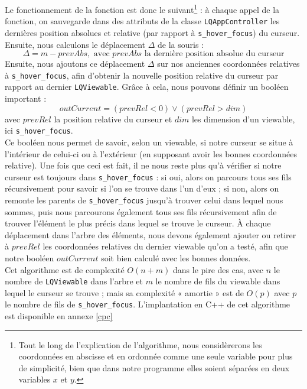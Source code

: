 \documentclass[twoside]{report}
\begin{document}
Le fonctionnement de la fonction est donc le suivant\footnote{Tout le long de l'explication de l'algorithme, nous considèrerons les coordonnées en abscisse et en ordonnée comme une seule variable pour plus de simplicité, bien que dans notre programme elles soient séparées en deux variables $x$ et $y$.} : à chaque appel de la fonction, on sauvegarde dans des attributs de la classe \verb!LQAppController! les dernières position absolues et relative (par rapport à \verb!s_hover_focus!) du curseur. Ensuite, nous calculons le déplacement $\Delta$ de la souris :
\[\Delta = m - prevAbs, \text{ avec $prevAbs$ la dernière position absolue du curseur}\]
Ensuite, nous ajoutons ce déplacement $\Delta$ sur nos anciennes coordonnées relatives à \verb!s_hover_focus!, afin d'obtenir la nouvelle position relative du curseur par rapport au dernier \verb!LQViewable!. Grâce à cela, nous pouvons définir un booléen important :
\[outCurrent = (prevRel < 0) \vee (prevRel > dim)\]
avec $prevRel$ la position relative du curseur et $dim$ les dimension d'un viewable, ici \verb!s_hover_focus!. \\
Ce booléen nous permet de savoir, selon un viewable, si notre curseur se situe à l'intérieur de celui-ci ou à l'extérieur (en supposant avoir les bonnes coordonnées relative).
Une fois que ceci est fait, il ne nous reste plus qu'à vérifier si notre curseur est toujours dans \verb!s_hover_focus! : si oui, alors on parcours tous ses fils récursivement pour savoir si l'on se trouve dans l'un d'eux ; si non, alors on remonte les parents de \verb!s_hover_focus! jusqu'à trouver celui dans lequel nous sommes, puis nous parcourons également tous ses fils récursivement afin de trouver l'élément le plus précis dans lequel se trouve le curseur. À chaque déplacement dans l'arbre des éléments, nous devons également ajouter ou retirer à $prevRel$ les coordonnées relatives du dernier viewable qu'on a testé, afin que notre booléen $outCurrent$ soit bien calculé avec les bonnes données. \\
Cet algorithme est de complexité $O(n+m)$ dans le pire des cas, avec $n$ le nombre de \verb!LQViewable! dans l'arbre et $m$ le nombre de fils du viewable dans lequel le curseur se trouve ; mais sa complexité « amortie » est de $O(p)$ avec $p$ le nombre de fils de \verb!s_hover_focus!. L'implantation en C++ de cet algorithme est disponible en annexe \ref{cpc}
\end{document}
